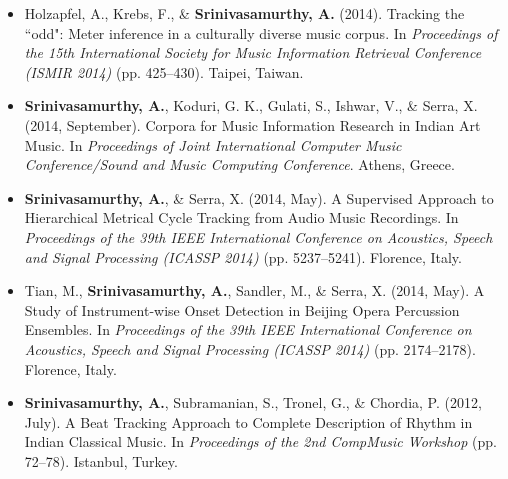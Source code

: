 \begin{itemize}[leftmargin=*]
	\item Holzapfel, A., Krebs, F., \& \textbf{Srinivasamurthy, A.} (2014). Tracking the ``odd": Meter inference in a culturally diverse music corpus. In \emph{Proceedings of the 15th International Society for Music Information Retrieval Conference (ISMIR 2014)} (pp. 425--430). Taipei, Taiwan.  %
	\item \textbf{Srinivasamurthy, A.}, Koduri, G. K., Gulati, S., Ishwar, V., \& Serra, X. (2014, September). Corpora for Music Information Research in Indian Art Music. In \emph{Proceedings of Joint International Computer Music Conference/Sound and Music Computing Conference}. Athens, Greece.  %
	\item \textbf{Srinivasamurthy, A.}, \& Serra, X. (2014, May). A Supervised Approach to Hierarchical Metrical Cycle Tracking from Audio Music Recordings. In \emph{Proceedings of the 39th IEEE International Conference on Acoustics, Speech and Signal Processing (ICASSP 2014)} (pp. 5237--5241). Florence, Italy.  %
	\item Tian, M., \textbf{Srinivasamurthy, A.}, Sandler, M., \& Serra, X. (2014, May). A Study of Instrument-wise Onset Detection in Beijing Opera Percussion Ensembles. In \emph{Proceedings of the 39th IEEE International Conference on Acoustics, Speech and Signal Processing (ICASSP 2014)} (pp. 2174--2178). Florence, Italy.  %
	\item \textbf{Srinivasamurthy, A.}, Subramanian, S., Tronel, G., \& Chordia, P. (2012, July). A Beat Tracking Approach to Complete Description of Rhythm in Indian Classical Music. In \emph{Proceedings of the 2nd CompMusic Workshop} (pp. 72--78). Istanbul, Turkey. 

\end{itemize}
